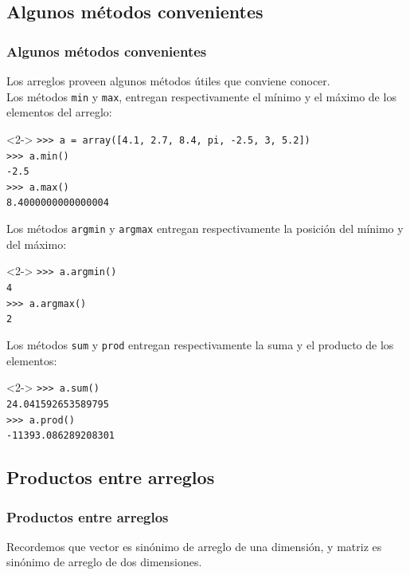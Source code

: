 \subsection{Algunos m\'{e}todos convenientes}
\begin{frame}[fragile]
\frametitle{Algunos m\'{e}todos convenientes}
Los arreglos proveen algunos m\'{e}todos \'{u}tiles que conviene conocer.
\\
\bigskip
Los m\'{e}todos \texttt{min} y \texttt{max}, entregan respectivamente el m\'{i}nimo y el m\'{a}ximo de los elementos del arreglo:
\begin{exampleblock}{}<2->
\verb|>>> a = array([4.1, 2.7, 8.4, pi, -2.5, 3, 5.2])| \\
\pause
\verb|>>> a.min()| \\
\pause
\verb|-2.5| \\
\pause
\verb|>>> a.max()| \\
\pause
\verb|8.4000000000000004|
\end{exampleblock}
\end{frame}
\begin{frame}[fragile]
Los m\'{e}todos \texttt{argmin} y \texttt{argmax} entregan respectivamente la posici\'{o}n del m\'{i}nimo y del m\'{a}ximo:
\begin{exampleblock}{}<2->
\verb|>>> a.argmin()| \\
\pause
\verb|4| \\
\pause
\verb|>>> a.argmax()| \\
\pause
\verb|2|
\end{exampleblock}
\end{frame}
\begin{frame}[fragile]
Los m\'{e}todos \texttt{sum} y \texttt{prod} entregan respectivamente la suma y el producto de los elementos:
\begin{exampleblock}{}<2->
\verb|>>> a.sum()| \\
\pause
\verb|24.041592653589795| \\
\pause
\verb|>>> a.prod()| \\
\pause
\verb|-11393.086289208301|
\end{exampleblock}
\end{frame}
\subsection{Productos entre arreglos}
\begin{frame}
\frametitle{Productos entre arreglos}
Recordemos que vector es sin\'{o}nimo de arreglo de una dimensi\'{o}n, y matriz es sin\'{o}nimo de arreglo de dos dimensiones.
\end{frame}
